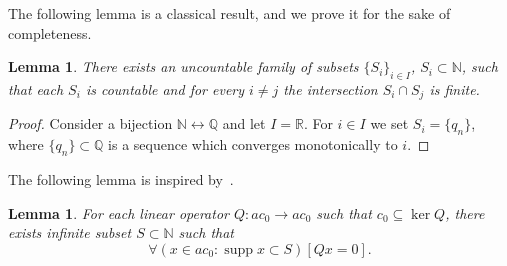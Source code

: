 \documentclass[a4paper,10pt]{article} %
\DeclareMathOperator{\supp}{supp}
\theoremstyle{plain}
\newtheorem{lemma}[theorem]{Lemma}
\theoremstyle{definition}
\begin{document}
The following lemma is a classical result, and we prove it for the sake of completeness.
\begin{lemma}
	\label{lem:uncountable_subsets_of_N_with_finite_intersections}
	There exists an uncountable family of subsets
	$\{S_i\}_{i\in I}$, $S_i \subset \mathbb{N}$,
	such that each $S_i$ is countable and for every $i\neq j$ the intersection $S_i \cap S_j$ is finite.
\end{lemma}

\begin{proof}
	Consider a bijection $\mathbb{N} \leftrightarrow \mathbb{Q}$
	and let $I = \mathbb{R}$.
	For $i\in I$ we set $S_i = \{q_n\}$,
	where $\{q_n\} \subset \mathbb{Q}$ is a sequence which converges monotonically to $i$.
\end{proof}








The following lemma is inspired by~\cite{mathSE_Phillips}.

\begin{lemma}
	\label{lem:c_0_not_complemented_in_ac_0}
	For each linear operator $Q: ac_0 \to ac_0$ such that $c_0\subseteq \ker Q$,
	there exists infinite subset $S \subset \mathbb{N}$ such that
	\begin{equation}
		\forall(x \in ac_0 : \supp x \subset S)[Qx = 0]
		.
	\end{equation}
\end{lemma}
\end{document}
